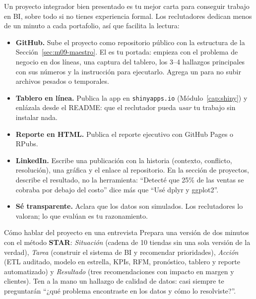 Un proyecto integrador bien presentado es tu mejor carta para conseguir
trabajo en BI, sobre todo si no tienes experiencia formal. Los reclutadores
dedican menos de un minuto a cada portafolio, así que facilita la lectura:

\begin{itemize}
  \item \textbf{GitHub.} Sube el proyecto como repositorio público con la
        estructura de la Sección~\ref{sec:m09-maestro}. El 
        es tu portada: empieza con el problema de negocio en dos líneas, una
        captura del tablero, los 3--4 hallazgos principales con sus números y
        la instrucción para ejecutarlo. Agrega un  para
        no subir archivos pesados o temporales.
  \item \textbf{Tablero en línea.} Publica la app en
        \texttt{shinyapps.io} (Módulo~\ref{cap:shiny}) y enlázala desde el
        README: que el reclutador pueda \emph{usar} tu trabajo sin instalar
        nada.
  \item \textbf{Reporte en HTML.} Publica el reporte ejecutivo con GitHub
        Pages o RPubs.
  \item \textbf{LinkedIn.} Escribe una publicación con la historia (contexto,
        conflicto, resolución), una gráfica y el enlace al repositorio. En
        la sección de proyectos, describe el resultado, no la herramienta:
        ``Detecté que 25\% de las ventas se cobraba por debajo del costo''
        dice más que ``Usé dplyr y ggplot2''.
  \item \textbf{Sé transparente.} Aclara que los datos son simulados. Los
        reclutadores lo valoran; lo que evalúan es tu razonamiento.
\end{itemize}

\begin{negocio}{Cómo hablar del proyecto en una entrevista}
Prepara una versión de dos minutos con el método \textbf{STAR}:
\emph{Situación} (cadena de 10 tiendas sin una sola versión de la verdad),
\emph{Tarea} (construir el sistema de BI y recomendar prioridades),
\emph{Acción} (ETL auditado, modelo en estrella, KPIs, RFM, pronóstico,
tablero y reporte automatizado) y \emph{Resultado} (tres recomendaciones con
impacto en margen y clientes). Ten a la mano un hallazgo de calidad de datos:
casi siempre te preguntarán ``¿qué problema encontraste en los datos y cómo
lo resolviste?''.
\end{negocio}

